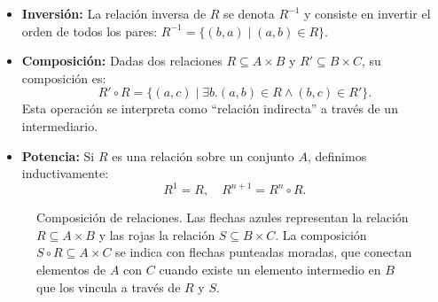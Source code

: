 \begin{itemize}
  \item \textbf{Inversi\'on:} La relaci\'on inversa de $R$ se denota $R^{-1}$ y consiste en invertir el orden de todos los pares: $R^{-1} = \{(b,a) \mid (a,b) \in R\}$.

  \item \textbf{Composici\'on:} Dadas dos relaciones $R \subseteq A \times B$ y $R' \subseteq B \times C$, su composici\'on es:
  \[ R' \circ R = \{(a,c) \mid \exists b. (a,b) \in R \land (b,c) \in R'\}. \]
  Esta operaci\'on se interpreta como ``relaci\'on indirecta'' a trav\'es de un intermediario.

  \item \textbf{Potencia:} Si $R$ es una relaci\'on sobre un conjunto $A$, definimos inductivamente:
  \[ R^1 = R, \quad R^{n+1} = R^n \circ R. \]
\end{itemize}


\begin{figure}[H]
\centering
{}
\caption{Composición de relaciones. Las flechas azules representan la relación \(R \subseteq A \times B\) y las rojas la relación \(S \subseteq B \times C\). La composición \(S \circ R \subseteq A \times C\) se indica con flechas punteadas moradas, que conectan elementos de \(A\) con \(C\) cuando existe un elemento intermedio en \(B\) que los vincula a través de \(R\) y \(S\).}
\end{figure}


